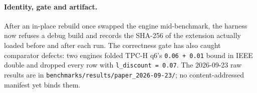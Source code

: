 \documentclass[10pt,twocolumn,letterpaper]{article}   %
\begin{document}
\paragraph{Identity, gate and artifact.} After an in-place rebuild once swapped the engine
mid-benchmark, the harness now refuses a debug build and records the SHA-256 of
the extension actually loaded before and after each run. The correctness gate has also caught
comparator defects: two engines folded TPC-H q6's \texttt{0.06 + 0.01} bound in IEEE double and
dropped every row with \texttt{l\_discount = 0.07}. The 2026-09-23 raw results are in
\texttt{benchmarks/results/paper\_2026-09-23/}; no content-addressed manifest yet
binds them.
\end{document}
